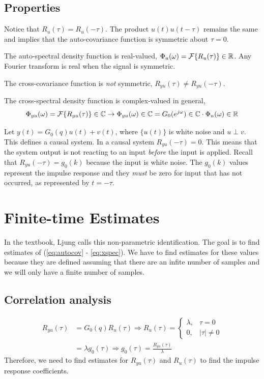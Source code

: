 \subsection{Properties}
Notice that $R_u(\tau)=R_u(-\tau)$. The product $u(t)u(t-\tau)$ remains the same and implies that the auto-covariance function is symmetric about $\tau=0$.

The auto-spectral density function is real-valued, $\Phi_u(\omega) = \mathcal{F}\{R_u(\tau)\}\in\mathbb{R}$. Any Fourier transform is real when the signal is symmetric.

The cross-covariance function is \textit{not} symmetric, $R_{yu}(\tau)\neq R_{yu}(-\tau)$.

The cross-spectral density function is complex-valued in general,
$$\Phi_{yu}(\omega) = \mathcal{F}\{R_{yu}(\tau)\}\in\mathbb{C} \rightarrow \Phi_{yu}(\omega)\in\mathbb{C} = G_0(e^{j\omega})\in\mathbb{C} \cdot \Phi_u(\omega)\in\mathbb{R}$$

Let $y(t) = G_0(q)u(t)+v(t)$, where $\{u(t)\}$ is white noise and $u\perp v$. This defines a causal system. In a causal system $R_{yu}(-\tau)=0$. This means that the system output is not reacting to an input \textit{before} the input is applied. Recall that $R_{yu}(-\tau)=g_0(k)$ because the input is white noise. The $g_0(k)$ values represent the impulse response and they \textit{must} be zero for input that has not occurred, as represented by $t=-\tau$.

\section{Finite-time Estimates}
In the textbook, Ljung calls this non-parametric identification. The goal is to find estimates of (\ref{eq:autocov} - \ref{eq:xspec}). We have to find estimates for these values because they are defined assuming that there are an infite number of samples and we will only have a finite number of samples.

\subsection{Correlation analysis}
\begin{align*}
R_{yu}(\tau) &= G_0(q)R_u(\tau) \Rightarrow R_u(\tau) = \begin{cases} \lambda, & \tau=0 \\ 0, & |\tau|\neq 0 \end{cases} \\
&= \lambda g_0(\tau) \Rightarrow g_0(\tau) = \frac{R_{yu}(\tau)}{\lambda}
\end{align*}
Therefore, we need to find estimates for $R_{yu}(\tau)$ and $R_u(\tau)$ to find the impulse response coefficients.

